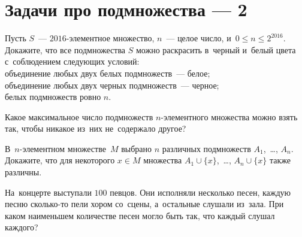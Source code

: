 
\section*{Задачи про подмножества --- 2}


\begin{problems}

\item
Пусть $S$~--- $2016$-элементное множество, $n$~--- целое число,
и~$0 \leq n \leq 2^{2016}$.
Докажите, что все подмножества $S$ можно раскрасить в~черный и~белый цвета
с~соблюдением следующих условий:
\\
\subproblem
объединение любых двух белых подмножеств~--- белое;
\\
\subproblem
объединение любых двух черных подмножеств~--- черное;
\\
\subproblem
белых подмножеств ровно $n$.

\item
Какое максимальное число подмножеств $n$-элементного множества можно взять так,
чтобы никакое из~них не~содержало другое?

\item
В~$n$-элементном множестве~$M$ выбрано $n$ различных подмножеств
$A_{1}$,~\ldots, $A_{n}$.
Докажите, что для некоторого $x \in M$ множества
$A_{1} \cup \{x\}$,~\ldots, $A_{n} \cup \{x\}$ также различны.

\item
На~концерте выступали $100$ певцов.
Они исполняли несколько песен, каждую песню сколько-то пели хором со~сцены,
а~остальные слушали из~зала.
При каком наименьшем количестве песен могло быть так, что  каждый слушал
каждого?

\end{problems}

